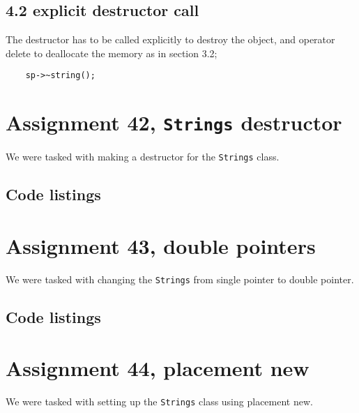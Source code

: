 \documentclass[11pt]{article}
\begin{document}
\subsection*{4.2 explicit destructor call}
The destructor has to be called explicitly to destroy the object, and operator delete to deallocate the memory as in section 3.2;
\begin{lstlisting}
	sp->~string();
\end{lstlisting}

\section*{Assignment 42, \texttt{Strings} destructor}
We were tasked with making a destructor for the \texttt{Strings} class.

\subsection*{Code listings}




\section*{Assignment 43, double pointers}
We were tasked with changing the \texttt{Strings} from single pointer to double pointer.

\subsection*{Code listings}










\section*{Assignment 44, placement new}
We were tasked with setting up the \texttt{Strings} class using placement new.
\end{document}
